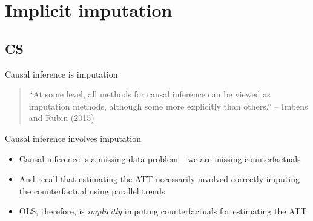 \documentclass{beamer}
\begin{document}
\section{Implicit imputation}

\subsection{CS}

\begin{frame}{Causal inference is imputation}

\begin{quote}
``At some level, all methods for causal inference can be viewed as imputation methods, although some more explicitly than others.'' -- Imbens and Rubin (2015)
\end{quote}

\end{frame}


\begin{frame}{Causal inference involves imputation}

\begin{itemize}
\item Causal inference is a missing data problem -- we are missing counterfactuals
\item And recall that estimating the ATT necessarily involved correctly imputing the counterfactual using parallel trends
\item OLS, therefore, is \emph{implicitly} imputing counterfactuals for estimating the ATT
\end{itemize}

\end{frame}
\end{document}
